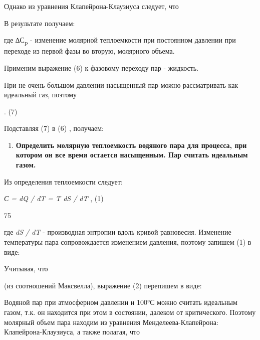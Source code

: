 Однако из уравнения Клапейрона-Клаузиуса следует, что


В результате получаем:


где ∆С\textsubscript{p} - изменение молярной теплоемкости при постоянном
давлении при переходе из первой фазы во вторую,
молярного объема.

Применим выражение (6) к фазовому переходу пар - жидкость.


При не очень большом давлении насыщенный пар можно рассматривать как
идеальный газ, поэтому %

. (7)

Подставляя (7) в (6) , получаем:


\begin{enumerate}
\def\labelenumi{\arabic{enumi}.}
\setcounter{enumi}{5}
\item
  \textbf{Определить молярную теплоемкость водяного пара для процесса,
  при котором он все время остается насыщенным. Пар считать идеальным
  газом.}
\end{enumerate}

\solving{}

Из определения теплоемкости следует:

\emph{С = dQ / dT = T dS / dT} , (1)

75

где \emph{dS / dT} - производная энтропии вдоль кривой равновесия.
Изменение температуры пара сопровождается изменением давления, поэтому
запишем (1) в виде:


Учитывая, что %

(из соотношений Максвелла), выражение (2) перепишем в виде:


Водяной пар при атмосферном давлении и 100°С можно считать идеальным
газом, т.к. он находится при этом в состоянии, далеком от критического.
Поэтому молярный объем пара находим из уравнения Менделеева-Клапейрона:
Клапейрона-Клаузиуса, а также полагая, что

